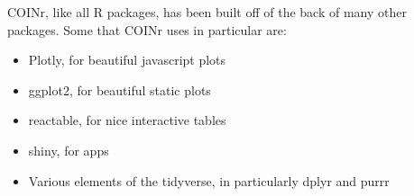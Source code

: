 \documentclass[
]{book}
\providecommand{\tightlist}{%
  \setlength{\itemsep}{0pt}\setlength{\parskip}{0pt}}
\begin{document}
COINr, like all R packages, has been built off of the back of many other packages. Some that COINr uses in particular are:

\begin{itemize}
\tightlist
\item
  Plotly, for beautiful javascript plots
\item
  ggplot2, for beautiful static plots
\item
  reactable, for nice interactive tables
\item
  shiny, for apps
\item
  Various elements of the tidyverse, in particularly dplyr and purrr
\end{itemize}

  
\end{document}
